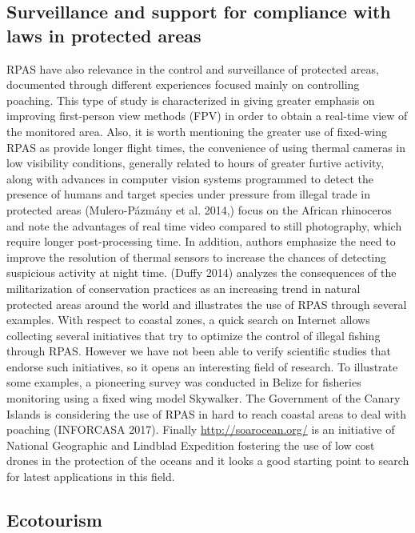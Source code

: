 \documentclass[]{interact}
\theoremstyle{plain}%
\theoremstyle{definition}
\theoremstyle{remark}
\begin{document}
\subsection{Surveillance and support for compliance with laws in
protected
areas}\label{surveillance-and-support-for-compliance-with-laws-in-protected-areas}

RPAS have also relevance in the control and surveillance of protected
areas, documented through different experiences focused mainly on
controlling poaching. This type of study is characterized in giving
greater emphasis on improving first-person view methods (FPV) in order
to obtain a real-time view of the monitored area. Also, it is worth
mentioning the greater use of fixed-wing RPAS as provide longer flight
times, the convenience of using thermal cameras in low visibility
conditions, generally related to hours of greater furtive activity,
along with advances in computer vision systems programmed to detect the
presence of humans and target species under pressure from illegal trade
in protected areas (Mulero-Pázmány et al. 2014,) focus on the African
rhinoceros and note the advantages of real time video compared to still
photography, which require longer post-processing time. In addition,
authors emphasize the need to improve the resolution of thermal sensors
to increase the chances of detecting suspicious activity at night time.
(Duffy 2014) analyzes the consequences of the militarization of
conservation practices as an increasing trend in natural protected areas
around the world and illustrates the use of RPAS through several
examples. With respect to coastal zones, a quick search on Internet
allows collecting several initiatives that try to optimize the control
of illegal fishing through RPAS. However we have not been able to verify
scientific studies that endorse such initiatives, so it opens an
interesting field of research. To illustrate some examples, a pioneering
survey was conducted in Belize for fisheries monitoring using a fixed
wing model Skywalker. The Government of the Canary Islands is
considering the use of RPAS in hard to reach coastal areas to deal with
poaching (INFORCASA 2017). Finally \url{http://soarocean.org/} is an
initiative of National Geographic and Lindblad Expedition fostering the
use of low cost drones in the protection of the oceans and it looks a
good starting point to search for latest applications in this field.

\subsection{Ecotourism}\label{ecotourism}
\end{document}
